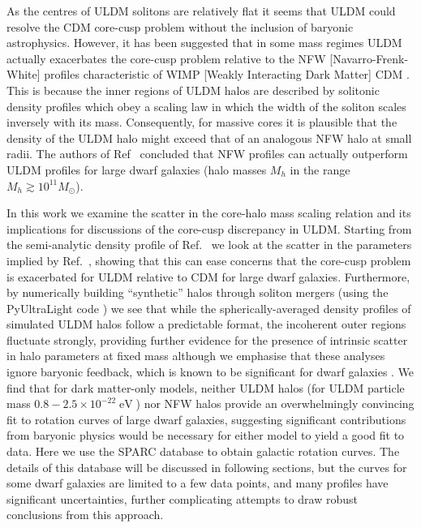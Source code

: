 \documentclass[a4paper,11pt]{article}
\begin{document}
As the  centres of ULDM solitons are relatively flat it seems that ULDM could  resolve the CDM core-cusp problem without the inclusion of baryonic astrophysics. However, it has  been suggested that in some mass regimes ULDM actually exacerbates the core-cusp problem relative to the NFW [Navarro-Frenk-White] profiles  \cite{Navarro:1995iw} characteristic of WIMP [Weakly Interacting Dark Matter] CDM \cite{Robles:2018fur}. This is because the inner regions of ULDM halos are described by solitonic density profiles which obey a scaling law in which the width of the soliton scales inversely with its mass. Consequently, for massive cores it is plausible that the density of the ULDM halo might exceed that of an analogous NFW halo at small radii. The authors of Ref~\cite{Robles:2018fur} concluded that NFW profiles can actually outperform ULDM profiles for large dwarf galaxies (halo masses $M_h$ in the range $M_h \gtrsim 10^{11} M_{\odot}$).  

In this work we examine the scatter in the core-halo mass scaling relation and its implications for discussions of the core-cusp discrepancy in ULDM. Starting from the semi-analytic density profile of Ref.~\cite{Robles:2018fur} we look at the scatter in the parameters implied by Ref.~\cite{Schive:2014hza}, showing that this can ease concerns that the core-cusp problem is  exacerbated for ULDM relative to CDM for large dwarf galaxies. Furthermore, by numerically building ``synthetic'' halos through soliton mergers (using the {\sc PyUltraLight} code \cite{Edwards:2018ccc}) we see that while the spherically-averaged density profiles of simulated ULDM halos follow a predictable format, the incoherent outer regions fluctuate strongly, providing further evidence for the presence of intrinsic scatter in halo parameters at fixed mass although we emphasise that these analyses ignore baryonic feedback, which is known to be significant for dwarf galaxies \cite{2018MNRAS.473.5698D, Benitez-Llambay:2018}. We find that for dark matter-only models, neither ULDM halos (for ULDM particle mass $0.8-2.5\times 10^{-22} \operatorname{eV}$)
nor NFW halos provide an overwhelmingly convincing fit to rotation curves of large dwarf galaxies, suggesting significant contributions from baryonic physics would be necessary for either model to yield a good fit to data. Here we use the SPARC database \cite{Lelli:2016zqa} to obtain galactic rotation curves. The details of this database will be discussed in following sections, but the curves for some dwarf galaxies are limited to a few data points, and many profiles have significant uncertainties, further complicating attempts to draw robust conclusions from this approach. 
\end{document}
